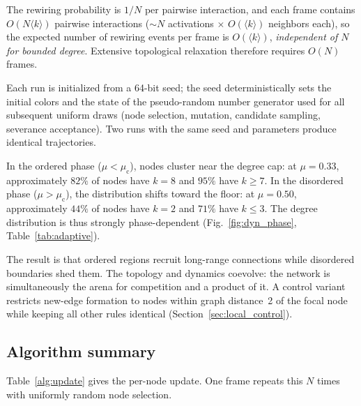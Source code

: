 \documentclass[preprint,12pt]{elsarticle}
\newcommand{\mc}{\mu_\mathrm{c}}      %
\newcommand{\kavg}{\langle k \rangle} %
\begin{document}
The rewiring probability is $1/N$ per pairwise interaction, and
each frame contains $O(N\kavg)$ pairwise interactions
(${\sim}N$ activations $\times$ $O(\kavg)$ neighbors each), so
the expected number of rewiring events per frame is $O(\kavg)$,
\emph{independent of $N$ for bounded degree}.
Extensive topological relaxation therefore requires $O(N)$
frames.

Each run is initialized from a 64-bit seed; the seed deterministically
sets the initial colors and the state of the pseudo-random number
generator used for all subsequent uniform draws (node selection,
mutation, candidate sampling, severance acceptance).
Two runs with the same seed and parameters produce identical
trajectories.

In the ordered phase ($\mu < \mc$), nodes cluster near
the degree cap: at $\mu = 0.33$, approximately $82\%$ of
nodes have $k = 8$ and $95\%$ have $k \geq 7$.
In the disordered phase ($\mu > \mc$), the distribution
shifts toward the floor: at $\mu = 0.50$, approximately
$44\%$ of nodes have $k = 2$ and $71\%$ have $k \leq 3$.
The degree distribution is thus strongly phase-dependent
(Fig.~\ref{fig:dyn_phase}, Table~\ref{tab:adaptive}).

The result is that ordered regions recruit long-range connections
while disordered boundaries shed them.
The topology and dynamics coevolve: the network is
simultaneously the arena for competition and a product of it.
A control variant restricts new-edge formation to nodes within
graph distance~2 of the focal node while keeping all other
rules identical (Section~\ref{sec:local_control}).

\subsection{Algorithm summary}

Table~\ref{alg:update} gives the per-node update.
One frame repeats this $N$ times with uniformly random node
selection.
\end{document}

